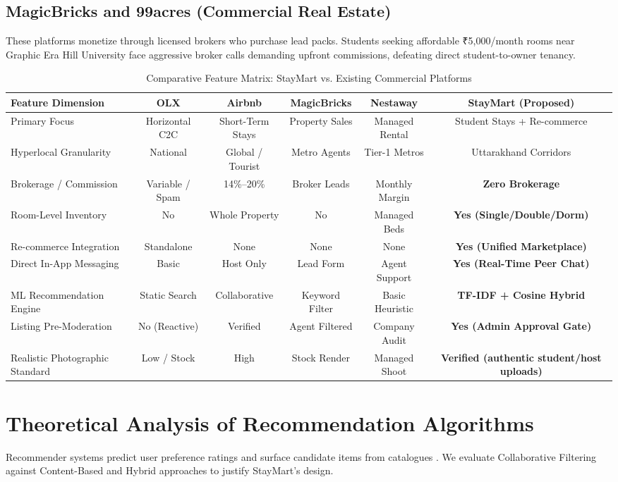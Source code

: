 \subsection{MagicBricks and 99acres (Commercial Real Estate)}
These platforms monetize through licensed brokers who purchase lead packs. Students seeking affordable ₹5,000/month rooms near Graphic Era Hill University face aggressive broker calls demanding upfront commissions, defeating direct student-to-owner tenancy.

\begin{table}[htbp]
\centering
\caption{Comparative Feature Matrix: StayMart vs. Existing Commercial Platforms}
\label{tab:comparative_matrix}
\footnotesize
\begin{tabularx}{\textwidth}{lccccc}
\toprule
\textbf{Feature Dimension} & \textbf{OLX} & \textbf{Airbnb} & \textbf{MagicBricks} & \textbf{Nestaway} & \textbf{StayMart (Proposed)} \\
\midrule
Primary Focus & Horizontal C2C & Short-Term Stays & Property Sales & Managed Rental & Student Stays + Re-commerce \\
Hyperlocal Granularity & National & Global / Tourist & Metro Agents & Tier-1 Metros & Uttarakhand Corridors \\
Brokerage / Commission & Variable / Spam & 14\%--20\% & Broker Leads & Monthly Margin & \textbf{Zero Brokerage} \\
Room-Level Inventory & No & Whole Property & No & Managed Beds & \textbf{Yes (Single/Double/Dorm)} \\
Re-commerce Integration & Standalone & None & None & None & \textbf{Yes (Unified Marketplace)} \\
Direct In-App Messaging & Basic & Host Only & Lead Form & Agent Support & \textbf{Yes (Real-Time Peer Chat)} \\
ML Recommendation Engine & Static Search & Collaborative & Keyword Filter & Basic Heuristic & \textbf{TF-IDF + Cosine Hybrid} \\
Listing Pre-Moderation & No (Reactive) & Verified & Agent Filtered & Company Audit & \textbf{Yes (Admin Approval Gate)} \\
Realistic Photographic Standard & Low / Stock & High & Stock Render & Managed Shoot & \textbf{Verified (authentic student/host uploads)} \\
\bottomrule
\end{tabularx}
\end{table}

\section{Theoretical Analysis of Recommendation Algorithms}
Recommender systems predict user preference ratings and surface candidate items from catalogues \cite{resnick1997recommender}. We evaluate Collaborative Filtering against Content-Based and Hybrid approaches to justify StayMart's design.

